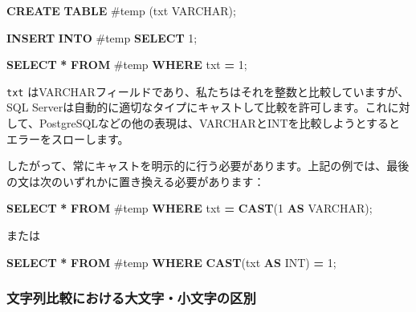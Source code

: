 \documentclass[
  11pt]{book}
\newenvironment{Shaded}{\begin{snugshade}}{\end{snugshade}}
\newcommand{\DataTypeTok}[1]{\textcolor[rgb]{0.13,0.29,0.53}{#1}}
\newcommand{\DecValTok}[1]{\textcolor[rgb]{0.00,0.00,0.81}{#1}}
\newcommand{\FunctionTok}[1]{\textcolor[rgb]{0.13,0.29,0.53}{\textbf{#1}}}
\newcommand{\KeywordTok}[1]{\textcolor[rgb]{0.13,0.29,0.53}{\textbf{#1}}}
\newcommand{\NormalTok}[1]{#1}
\newcommand{\OperatorTok}[1]{\textcolor[rgb]{0.81,0.36,0.00}{\textbf{#1}}}
\newcommand{\StringTok}[1]{\textcolor[rgb]{0.31,0.60,0.02}{#1}}
\theoremstyle{definition}
\theoremstyle{definition}
\theoremstyle{definition}
\theoremstyle{definition}
\theoremstyle{remark}
\begin{document}
\begin{Shaded}
\begin{Highlighting}[]
\KeywordTok{CREATE} \KeywordTok{TABLE}\NormalTok{ \#temp (txt }\DataTypeTok{VARCHAR}\NormalTok{);}

\KeywordTok{INSERT} \KeywordTok{INTO}\NormalTok{ \#temp}
\KeywordTok{SELECT} \StringTok{\textquotesingle{}1\textquotesingle{}}\NormalTok{;}

\KeywordTok{SELECT} \OperatorTok{*} \KeywordTok{FROM}\NormalTok{ \#temp }\KeywordTok{WHERE}\NormalTok{ txt }\OperatorTok{=} \DecValTok{1}\NormalTok{;}
\end{Highlighting}
\end{Shaded}

\texttt{txt} はVARCHARフィールドであり、私たちはそれを整数と比較していますが、SQL Serverは自動的に適切なタイプにキャストして比較を許可します。これに対して、PostgreSQLなどの他の表現は、VARCHARとINTを比較しようとするとエラーをスローします。

したがって、常にキャストを明示的に行う必要があります。上記の例では、最後の文は次のいずれかに置き換える必要があります：

\begin{Shaded}
\begin{Highlighting}[]
\KeywordTok{SELECT} \OperatorTok{*} \KeywordTok{FROM}\NormalTok{ \#temp }\KeywordTok{WHERE}\NormalTok{ txt }\OperatorTok{=} \FunctionTok{CAST}\NormalTok{(}\DecValTok{1} \KeywordTok{AS} \DataTypeTok{VARCHAR}\NormalTok{);}
\end{Highlighting}
\end{Shaded}

または

\begin{Shaded}
\begin{Highlighting}[]
\KeywordTok{SELECT} \OperatorTok{*} \KeywordTok{FROM}\NormalTok{ \#temp }\KeywordTok{WHERE} \FunctionTok{CAST}\NormalTok{(txt }\KeywordTok{AS} \DataTypeTok{INT}\NormalTok{) }\OperatorTok{=} \DecValTok{1}\NormalTok{;}
\end{Highlighting}
\end{Shaded}

\subsubsection*{文字列比較における大文字・小文字の区別}\label{ux6587ux5b57ux5217ux6bd4ux8f03ux306bux304aux3051ux308bux5927ux6587ux5b57ux5c0fux6587ux5b57ux306eux533aux5225}
\end{document}
